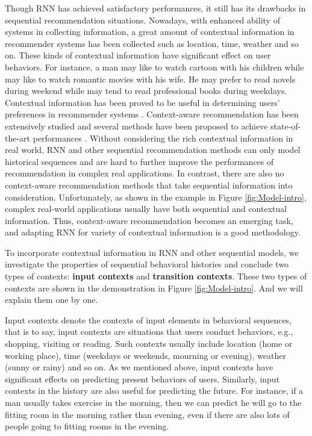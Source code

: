 \documentclass{sig-alternate}
\begin{document}
Though RNN has achieved satisfactory performances, it still has its drawbacks in sequential recommendation situations. Nowadays, with enhanced ability of systems in collecting information, a great amount of contextual information in recommender systems has been collected such as location, time, weather and so on. These kinds of contextual information have significant effect on user behaviors. For instance, a man may like to watch cartoon with his children while may like to watch romantic movies with his wife. He may prefer to read novels during weekend while may tend to read professional books during weekdays. Contextual information has been proved to be useful in determining users' preferences in recommender systems \cite{palmisano2008using,adomavicius2011context}. Context-aware recommendation has been extensively studied and several methods have been proposed to achieve state-of-the-art performances \cite{rendle2011fast,shi2012tfmap,jamali2013heteromf,shi2014cars,liu2015cot}. Without considering the rich contextual information in real world, RNN and other sequential recommendation methods can only model historical sequences and are hard to further improve the performances of recommendation in complex real applications. In contrast, there are also no context-aware recommendation methods that take sequential information into consideration. Unfortunately, as shown in the example in Figure \ref{fig:Model-intro}, complex real-world applications usually have both sequential and contextual information. Thus, context-aware recommendation becomes an emerging task, and adapting RNN for variety of contextual information is a good methodology.

To incorporate contextual information in RNN and other sequential models, we investigate the properties of sequential behavioral histories and conclude two types of contexts: \textbf{input contexts} and \textbf{transition contexts}. These two types of contexts are shown in the demonstration in Figure \ref{fig:Model-intro}. And we will explain them one by one.

Input contexts denote the contexts of input elements in behavioral sequences, that is to say, input contexts are situations that users conduct behaviors, e.g., shopping, visiting or reading. Such contexts usually include location (home or working place), time (weekdays or weekends, mourning or evening), weather (sunny or rainy) and so on. As we mentioned above, input contexts have significant effects on predicting present behaviors of users. Similarly, input contexts in the history are also useful for predicting the future. For instance, if a man usually takes exercise in the morning, then we can predict he will go to the fitting room in the morning rather than evening, even if there are also lots of people going to fitting rooms in the evening.
\end{document}
